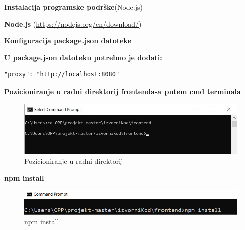 		   	\noindent {}
		   		\begin{packed_enum}
				
					\item \textbf{Instalacija programske podrške}(Node.js)
    					\begin{packed_item}
                			\item \textbf{Node.js} (\url{https://nodejs.org/en/download/})
                		
    		      \end{packed_item}
					\item \textbf{Konfiguracija package.json datoteke}
					\begin{packed_item}
                			\item \textbf{U package.json datoteku potrebno je dodati: }
                			\begin{verbatim}"proxy": "http://localhost:8080"
                			\end{verbatim}
                		
    		      \end{packed_item}
					
    					
    		            
    		  \item \textbf{Pozicioniranje u radni direktorij frontenda-a putem cmd terminala}
    		            \begin{figure}[H]
    					\includegraphics[width=\linewidth]{slike/frontend/prva.jpg}
    					\centering
    					\caption{Pozicioniranje u radni direktorij}
    					\label{fig:pozicioniranje2}
    		            \end{figure}
    		            
    		 \item \textbf{npm install}
    		            \begin{figure}[H]
    					\includegraphics[width=\linewidth]{slike/frontend/treca.png}
    					\centering
    					\caption{npm install}
    					\label{fig:npm install}
    		            \end{figure}
    		            

\end{packed_enum}
